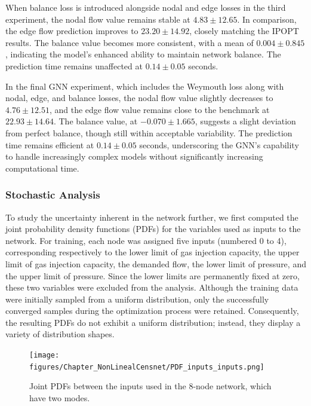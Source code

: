 When balance loss is introduced alongside nodal and edge losses in the third experiment, the nodal flow value remains stable at \( 4.83 \pm 12.65 \). In comparison, the edge flow prediction improves to \( 23.20 \pm 14.92 \), closely matching the IPOPT results. The balance value becomes more consistent, with a mean of \( 0.004 \pm 0.845 \), indicating the model's enhanced ability to maintain network balance. The prediction time remains unaffected at \( 0.14 \pm 0.05 \) seconds.

In the final GNN experiment, which includes the Weymouth loss along with nodal, edge, and balance losses, the nodal flow value slightly decreases to \( 4.76 \pm 12.51 \), and the edge flow value remains close to the benchmark at \( 22.93 \pm 14.64 \). The balance value, at \( -0.070 \pm 1.665 \), suggests a slight deviation from perfect balance, though still within acceptable variability. The prediction time remains efficient at \( 0.14 \pm 0.05 \) seconds, underscoring the GNN's capability to handle increasingly complex models without significantly increasing computational time.


\subsubsection{Stochastic Analysis}
To study the uncertainty inherent in the network further, we first computed the joint probability density functions (PDFs) for the variables used as inputs to the network. For training, each node was assigned five inputs (numbered 0 to 4), corresponding respectively to the lower limit of gas injection capacity, the upper limit of gas injection capacity, the demanded flow, the lower limit of pressure, and the upper limit of pressure. Since the lower limits are permanently fixed at zero, these two variables were excluded from the analysis. Although the training data were initially sampled from a uniform distribution, only the successfully converged samples during the optimization process were retained. Consequently, the resulting PDFs do not exhibit a uniform distribution; instead, they display a variety of distribution shapes.


\begin{figure}
    \begin{center}
        \texttt{[image: figures/Chapter\_NonLinealCensnet/PDF\_inputs\_inputs.png]}
    \end{center}
    \caption{Joint PDFs between the inputs used in the 8-node network, which have two modes. }\label{fig:joint_distributions_input_input}
\end{figure}
     


